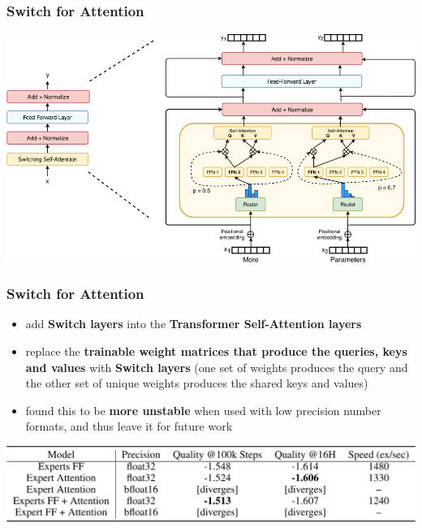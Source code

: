 \documentclass{beamer}
\begin{document}
\begin{frame}
    \frametitle{Switch for Attention}
    \begin{center}
        \includegraphics[scale=0.3]{img/switch_transformers_attention.png}
    \end{center}
\end{frame}

\begin{frame}
    \frametitle{Switch for Attention}
    \begin{center}
        \begin{itemize}
            \item add \textbf{Switch layers} into the \textbf{Transformer Self-Attention layers}
            \item replace the \textbf{trainable weight matrices that produce the queries, keys and values} with \textbf{Switch layers} (one set of weights produces the query and the other set of unique weights produces the shared keys and values)
            \item found this to be \textbf{more unstable} when used with low precision number formats, and thus leave it for future work
        \end{itemize}
        \includegraphics[scale=0.28]{img/switch_transformers_attention_result.png}
    \end{center}
\end{frame}
\end{document}
